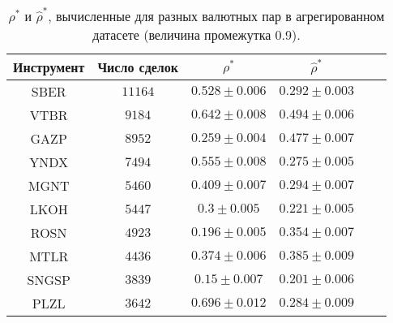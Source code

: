 \begin{table}[h!]
    \begin{center}
        \begin{tabular}{|c|c|c|c|c|c|}
            \hline
            Инструмент & Число сделок & $\rho^*$ & $\hat \rho^*$            \\ \hline
            SBER & $11164$ & $0.528 \pm 0.006$ & $0.292 \pm 0.003$ \\ \hline
            VTBR       & $9184$       & $0.642 \pm 0.008$ & $0.494 \pm 0.006$ \\ \hline
            GAZP       & $8952$       & $0.259 \pm 0.004$ & $0.477 \pm 0.007$ \\ \hline
            YNDX       & $7494$       & $0.555 \pm 0.008$ & $0.275 \pm 0.005$ \\ \hline
            MGNT       & $5460$       & $0.409 \pm 0.007$ & $0.294 \pm 0.007$ \\ \hline
            LKOH       & $5447$       & $0.3 \pm 0.005$   & $0.221 \pm 0.005$ \\ \hline
            ROSN       & $4923$       & $0.196 \pm 0.005$ & $0.354 \pm 0.007$ \\ \hline
            MTLR       & $4436$       & $0.374 \pm 0.006$ & $0.385 \pm 0.009$ \\ \hline
            SNGSP      & $3839$       & $0.15 \pm 0.007$  & $0.201 \pm 0.006$ \\ \hline
            PLZL       & $3642$       & $0.696 \pm 0.012$ & $0.284 \pm 0.009$ \\ \hline
        \end{tabular}
    \end{center}\caption{$\rho^*$ и $\hat \rho^*$, вычисленные для разных валютных пар в агрегированном датасете (величина промежутка 0.9).}
    \label{Aggreg1CU0.9} \end{table}

